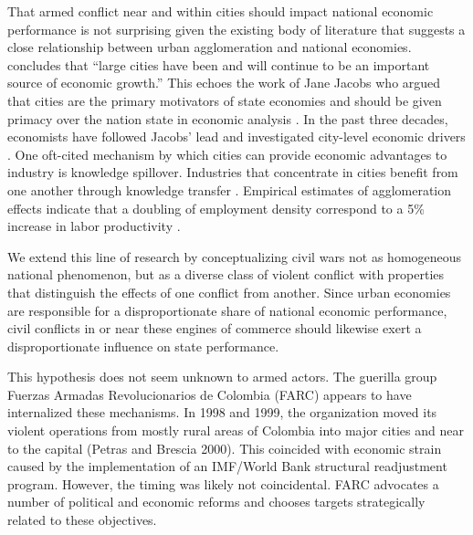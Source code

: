 That armed conflict near and within cities should impact national economic performance is not surprising given the existing body of literature that suggests a close relationship between urban agglomeration and national economies. \cite[p. 137]{quigley:1998} concludes that ``large cities have been and will continue to be an important source of economic growth.''  This echoes the work of Jane Jacobs who argued that cities are the primary motivators of state economies and should be given primacy over the nation state in economic analysis \citep{jacobs:1969,jacobs:1984}.  In the past three decades, economists have followed Jacobs' lead and investigated city-level economic drivers \citep{lucas:1988, ciccone:hall:1996, begg:1999}. One oft-cited mechanism by which cities can provide economic advantages to industry is knowledge spillover. Industries that concentrate in cities benefit from one another through knowledge transfer \citep{jaffe:etal:1993, glaeser:1994, firestone:2010}.  Empirical estimates of agglomeration effects indicate that a doubling of employment density correspond to a 5\% increase in labor productivity \citep{ciccone:hall:1996,ciccone:2002}. 


We extend this line of research by conceptualizing civil wars not as homogeneous national phenomenon, but as a diverse class of violent conflict with properties that distinguish the effects of one conflict from another. Since urban economies are responsible for a disproportionate share of national economic performance, civil conflicts in or near these engines of commerce should likewise exert a disproportionate influence on state performance.  

This hypothesis does not seem unknown to armed actors.  The guerilla group Fuerzas Armadas Revolucionarios de Colombia (FARC) appears to have internalized these mechanisms.  In 1998 and 1999, the organization moved its violent operations from mostly rural areas of Colombia into major cities and near to the capital (Petras and Brescia 2000).  This coincided with economic strain caused by the implementation of an IMF/World Bank structural readjustment program.  However, the timing was likely not coincidental.  FARC advocates a number of political and economic reforms and chooses targets strategically related to these objectives.

